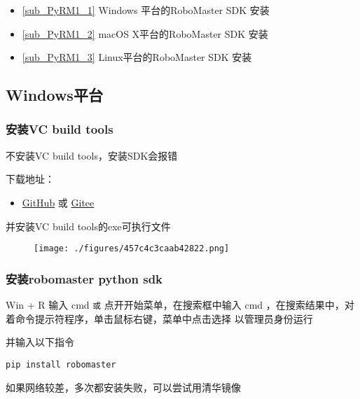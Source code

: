 
\begin{issues}
\issueTODO
\end{issues}

\begin{itemize}
\item \autoref{sub_PyRM1_1} Windows 平台的RoboMaster SDK 安装
\item \autoref{sub_PyRM1_2} macOS X平台的RoboMaster SDK 安装
\item \autoref{sub_PyRM1_3} Linux平台的RoboMaster SDK 安装
\end{itemize}

\subsection{Windows平台}\label{sub_PyRM1_1}
\subsubsection{安装VC build tools}
不安装VC build tools，安装SDK会报错

下载地址：\begin{itemize}
\item \href{https://github.com/dji-sdk/robomaster-sdk}{GitHub} 或 \href{https://gitee.com/xitinglin/RoboMaster-SDK}{Gitee}
\end{itemize}

并安装VC build tools的exe可执行文件

\begin{figure}[ht]
\centering
\texttt{[image: ./figures/457c4c3caab42822.png]}
\caption{} \label{fig_PyRM1_1}
\end{figure}

\subsubsection{安装robomaster python sdk}
Win + R 输入 cmd 
\verb|或|
点开开始菜单，在搜索框中输入 cmd ，在搜索结果中，对着命令提示符程序，单击鼠标右键，菜单中点击选择 以管理员身份运行 

并输入以下指令

\begin{lstlisting}[language=pythonC]
pip install robomaster
\end{lstlisting}

如果网络较差，多次都安装失败，可以尝试用清华镜像

